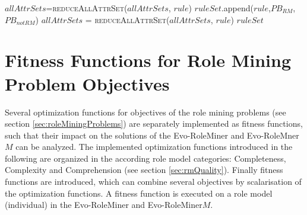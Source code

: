 \begin{algorithm}
\begin{algorithmic}[1]
                                                \State $allAttrSets$=\textsc{reduceAllAttrSet}($allAttrSets$, $rule$)
                                            \EndIf
                                        \EndFor
                                        \fi
                                    \EndIf
                                \Else
                                    \State $ruleSet$.append($rule$,$PB_{RM}$,$PB_{notRM}$)
                                        \State $allAttrSets$ = \textsc{reduceAllAttrSet}($allAttrSets$, $rule$)
                                    \EndIf
                                \EndIf
                            \EndIf
                        \EndWhile 
                    \EndWhile
                    \State \Return $ruleSet$
                \EndProcedure
            \end{algorithmic}
        \end{algorithm}
        
    \section{Fitness Functions for Role Mining Problem Objectives}
    \label{sec:optimizationFunctions}
    Several optimization functions for objectives of the role mining problems (see section \ref{sec:roleMiningProblems}) are separately implemented as fitness functions, such that their impact on the solutions of the Evo-RoleMiner and Evo-RoleMner$M$ can be analyzed. The implemented optimization functions introduced in the following are organized in the according role model categories: Completeness, Complexity and Comprehension (see section \ref{sec:rmQuality}). Finally fitness functions are introduced, which can combine several objectives by scalarisation of the optimization functions. A fitness function is executed on a role model (individual) in the Evo-RoleMiner and Evo-RoleMiner$M$.
